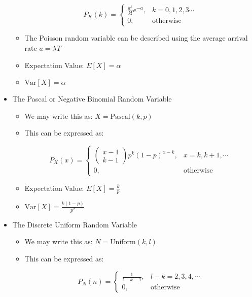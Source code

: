\begin{itemize}
\begin{itemize}
        $$P_K(k)=\left\{ \begin{array}{ll} \frac{a^k}{k!}e^{-a},&k=0,1,2,3\cdots\\0,&\text{otherwise}\end{array}$$

        \item The Poisson random variable can be described using the average arrival rate $a=\lambda T$

        \item Expectation Value: $E[X]=\alpha$

        \item $\text{Var}[X]=\alpha$

    \end{itemize}

  \item The Pascal or Negative Binomial Random Variable

    \begin{itemize}

      \item We may write this as: $X=\text{Pascal}(k,p)$

      \item This can be expressed as:

        $$P_X(x)=\left\{ \begin{array}{ll} \left( \begin{matrix} x-1\\k-1\end{matrix} \right)p^k(1-p)^{x-k},&x=k,k+1,\cdots\\0,&\text{otherwise}\end{array}$$

        \item Expectation Value: $E[X]=\frac{k}{p}$

        \item $\text{Var}[X]=\frac{k(1-p)}{p^2}$

    \end{itemize}

  \item The Discrete Uniform Random Variable

    \begin{itemize}

      \item We may write this as: $N=\text{Uniform}(k,l)$

      \item This can be expressed as:

        $$P_N(n)=\left\{ \begin{array}{ll} \frac{1}{l-k-1},&l-k=2,3,4,\cdots\\0,&\text{otherwise}\end{array}$$


\end{itemize}
\end{itemize}
